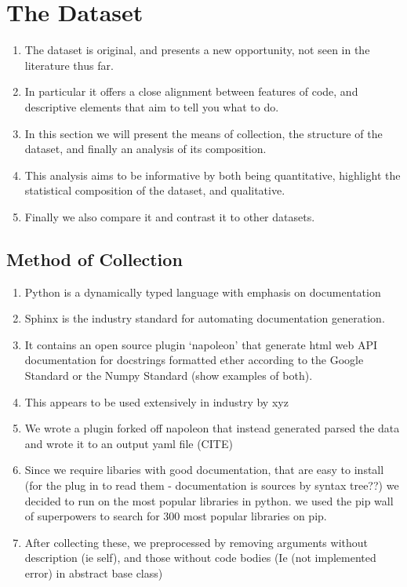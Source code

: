 \chapter{The Dataset}
\label{the_dataset}

\begin{enumerate}
    \item The dataset is original, and presents a new opportunity, not seen in the literature thus far.
    \item In particular it offers a close alignment between features of code, and descriptive elements that aim to tell you what to do.
    \item In this section we will present the means of collection, the structure of the dataset, and finally an analysis of its composition. 
    \item This analysis aims to be informative by both being quantitative, highlight the statistical composition of the dataset, and qualitative.

    \item Finally we  also compare it and contrast it to other datasets.
\end{enumerate}

\section{Method of Collection} %
\label{sec:method_of_collection}

\begin{enumerate}
    \item Python is a dynamically typed language with emphasis on documentation
    \item Sphinx is the industry standard for automating documentation generation.
    \item It contains an open source plugin `napoleon' that generate html web API documentation for docstrings formatted ether according to the Google Standard or the Numpy Standard (show examples of both).
    \item This appears to be used extensively in industry by xyz
    \item We wrote a plugin forked off napoleon that instead generated parsed the data and wrote it to an output yaml file (CITE)
    \item Since we require libaries with good documentation, that are easy to install (for the plug in to read them - documentation is sources by syntax tree??) we decided to run on the most popular libraries in python. we used the pip wall of superpowers to search for 300 most popular libraries on pip.
    \item After collecting these, we preprocessed by removing arguments without description (ie self), and those without code bodies (Ie (not implemented error) in abstract base class)
\end{enumerate}

